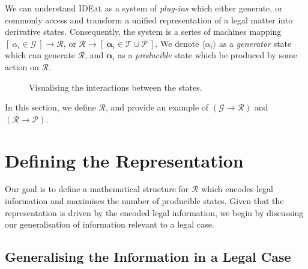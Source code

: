 \documentclass{article}
\newcounter{pic}[page]
\newcounter{fig}[page]
\numberwithin{equation}{section}
\newcommand{\ideal}{\textsc{IDEal }}
\newcommand{\braket}[1]{\langle #1 \rangle}
\begin{document}
We can understand \ideal as a system of \textit{plug-ins} which either generate, or commonly access and transform a unified representation of a legal matter into derivative states. Consequently, the system is a series of machines mapping $[ \ \alpha_i \in \mathcal{G} \ ] \rightarrow \mathcal{R}$, or $\mathcal{R} \rightarrow [ \ \mathbf{\alpha}_i \in \mathcal{T \cup P} \ ]$. We denote $\braket{\alpha_i}$ as a \textit{generator} state which can generate $\mathcal{R}$, and $\mathbf{\alpha}_i$ as a \textit{producible} state which be produced by some action on $\mathcal{R}$.
\begin{figure}[h]
\begin{center}
\end{center}
\caption{Visualising the interactions between the states.}
\end{figure}

In this section, we define $\mathcal{R}$, and provide an example of $(\mathcal{G} \rightarrow \mathcal{R})$ and $(\mathcal{R} \rightarrow \mathcal{P})$.


\section{Defining the Representation}

Our goal is to define a mathematical structure for $\mathcal{R}$ which encodes legal information and maximises the number of producible states. Given that the representation is driven by the encoded legal information, we begin by discussing our generalisation of information relevant to a legal case.

\subsection{Generalising the Information in a Legal Case}
\end{document}
